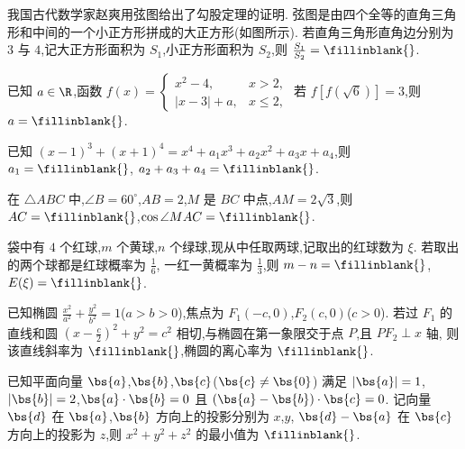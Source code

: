 \begin{problem}
我国古代数学家赵爽用弦图给出了勾股定理的证明. 弦图是由四个全等的直角三角形和中间的一个小正方形拼成的大正方形(如图所示).
若直角三角形直角边分别为 \(3\) 与 \(4\),记大正方形面积为 \(S_1\),小正方形面积为 \(S_2\),则 \(\frac{S_1}{S_2}=\fillinblank{}\).

\end{problem}

\begin{problem}
已知 \(a\in\R\),函数 \(f(x)=\begin{cases}
x^{2}-4,&x>2,\\
|x-3|+a,&x\le 2,
\end{cases}\) 若 \(f\left[f(\sqrt{6})\right]=3\),则 \(a=\fillinblank{}\).
\end{problem}

\begin{problem}
已知
\((x-1)^3+(x+1)^4=x^4+a_1x^3+a_2x^2+a_3x+a_4\),则
\(a_1=\fillinblank{}\),
\(a_2+a_3+a_4=\fillinblank{}\).
\end{problem}

\begin{problem}
在 \(\triangle ABC\) 中,\(\angle B=60^\circ\),\(AB=2\),\(M\) 是 \(BC\) 中点,\(AM=2\sqrt{3}\),则
\(AC=\fillinblank{}\),\(\cos\angle MAC=\fillinblank{}\).

\end{problem}

\begin{problem}
袋中有 \(4\) 个红球,\(m\) 个黄球,\(n\) 个绿球,现从中任取两球,记取出的红球数为 \(\xi\).
若取出的两个球都是红球概率为 \(\frac{1}{6}\),
一红一黄概率为 \(\frac{1}{3}\),则
\(m-n=\fillinblank{}\),\(E(\xi)=\fillinblank{}\).
\end{problem}

\begin{problem}
已知椭圆 \(\frac{x^2}{a^2}+\frac{y^2}{b^2}=1\)(\(a>b>0\)),焦点为
\(F_1(-c,0)\),\(F_2(c,0)\)(\(c>0\)).
若过 \(F_1\) 的直线和圆
\((x-\frac{c}{2})^2+y^2=c^2\) 相切,与椭圆在第一象限交于点 \(P\),且 \(PF_2\perp x\) 轴,
则该直线斜率为 \(\fillinblank{}\),椭圆的离心率为 \(\fillinblank{}\).

\end{problem}

\begin{problem}
已知平面向量 \(\bs{a}\),\(\bs{b}\),\(\bs{c}\)(\(\bs{c}\ne\bs{0}\))
满足 \(|\bs{a}|=1\),\(|\bs{b}|=2\),\(\bs{a}\cdot\bs{b}=0\) 且 \((\bs{a}-\bs{b})\cdot\bs{c}=0\).
记向量 \(\bs{d}\) 在 \(\bs{a}\),\(\bs{b}\) 方向上的投影分别为 \(x\),\(y\),
\(\bs{d}-\bs{a}\) 在 \(\bs{c}\) 方向上的投影为 \(z\),则
\(x^2+y^2+z^2\) 的最小值为 \(\fillinblank{}\).
\end{problem}

